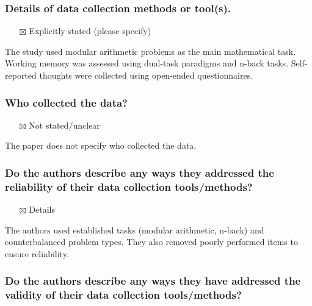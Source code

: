 \documentclass[
  doc, a4paper]{apa7}
\providecommand{\tightlist}{%
  \setlength{\itemsep}{0pt}\setlength{\parskip}{0pt}}
\begin{document}
\subsubsection{Details of data collection methods or tool(s).}\label{details-of-data-collection-methods-or-tools.}

\begin{itemize}
\tightlist
\item[$\boxtimes$]
  Explicitly stated (please specify)
\end{itemize}

The study used modular arithmetic problems as the main mathematical task. Working memory was assessed using dual-task paradigms and n-back tasks. Self-reported thoughts were collected using open-ended questionnaires.

\subsubsection{Who collected the data?}\label{who-collected-the-data}

\begin{itemize}
\tightlist
\item[$\boxtimes$]
  Not stated/unclear
\end{itemize}

The paper does not specify who collected the data.

\subsubsection{Do the authors describe any ways they addressed the reliability of their data collection tools/methods?}\label{do-the-authors-describe-any-ways-they-addressed-the-reliability-of-their-data-collection-toolsmethods}

\begin{itemize}
\tightlist
\item[$\boxtimes$]
  Details
\end{itemize}

The authors used established tasks (modular arithmetic, n-back) and counterbalanced problem types. They also removed poorly performed items to ensure reliability.

\subsubsection{Do the authors describe any ways they have addressed the validity of their data collection tools/methods?}\label{do-the-authors-describe-any-ways-they-have-addressed-the-validity-of-their-data-collection-toolsmethods}
\end{document}
